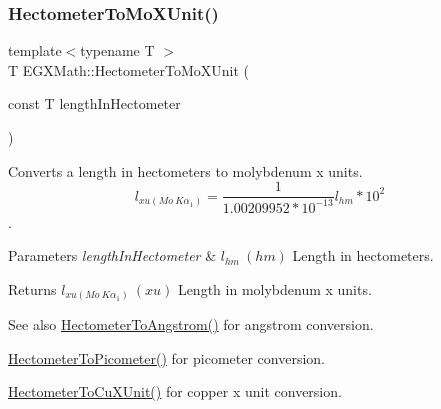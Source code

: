 \subsubsection{\texorpdfstring{Hectometer\+To\+Mo\+X\+Unit()}{HectometerToMoXUnit()}}
{\footnotesize\ttfamily template$<$typename T $>$ \\
T E\+G\+X\+Math\+::\+Hectometer\+To\+Mo\+X\+Unit (\begin{DoxyParamCaption}\item[{const T}]{length\+In\+Hectometer }\end{DoxyParamCaption})}



Converts a length in hectometers to molybdenum x units. \[ l_{xu(Mo\ K\alpha_1)}=\frac{1}{1.00209952*10^{-13}} l_{hm} * 10^{2}\]. 


\begin{DoxyParams}{Parameters}
{\em length\+In\+Hectometer} & $ l_{hm}\ (hm)$ Length in hectometers. \\
\hline
\end{DoxyParams}
\begin{DoxyReturn}{Returns}
$ l_{xu(Mo\ K\alpha_1)}\ (xu)$ Length in molybdenum x units. 
\end{DoxyReturn}
\begin{DoxySeeAlso}{See also}
\mbox{\hyperlink{group___e_g_x_math-_conversions-_length_conversions-_s_i-_hectometer-_non-_s_i_gad1296c0169aa8a99802a30b65a2ea516}{Hectometer\+To\+Angstrom()}} for angstrom conversion. 

\mbox{\hyperlink{group___e_g_x_math-_conversions-_length_conversions-_s_i-_hectometer-_s_i_gaa45a09cd750ee4e48680332f0ce39f07}{Hectometer\+To\+Picometer()}} for picometer conversion. 

\mbox{\hyperlink{group___e_g_x_math-_conversions-_length_conversions-_s_i-_hectometer-_non-_s_i_ga5c1d570e3bec185a917f3987d45529be}{Hectometer\+To\+Cu\+X\+Unit()}} for copper x unit conversion. 
\end{DoxySeeAlso}
